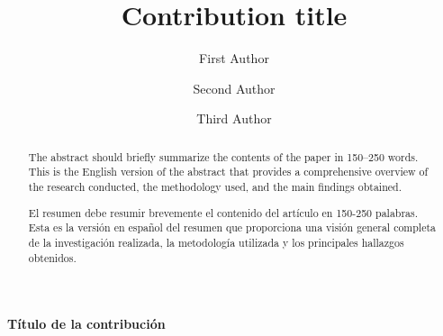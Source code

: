 \documentclass{llncs}
\begin{document}
%
\title{Contribution title}

%
\author{First Author \and
Second Author \and
Third Author}
%
%
%
\maketitle              %
%
\begin{abstract}
The abstract should briefly summarize the contents of the paper in
150--250 words. This is the English version of the abstract that 
provides a comprehensive overview of the research conducted, 
the methodology used, and the main findings obtained.

\end{abstract}


\begin{center}
\vspace{1cm}
{\Large \bfseries\boldmath Título de la contribución}

\vspace{0.5cm}
\end{center}

\begin{abstract}
El resumen debe resumir brevemente el contenido del artículo en
150-250 palabras. Esta es la versión en español del resumen que
proporciona una visión general completa de la investigación realizada,
la metodología utilizada y los principales hallazgos obtenidos.

\end{abstract}
\end{document}
